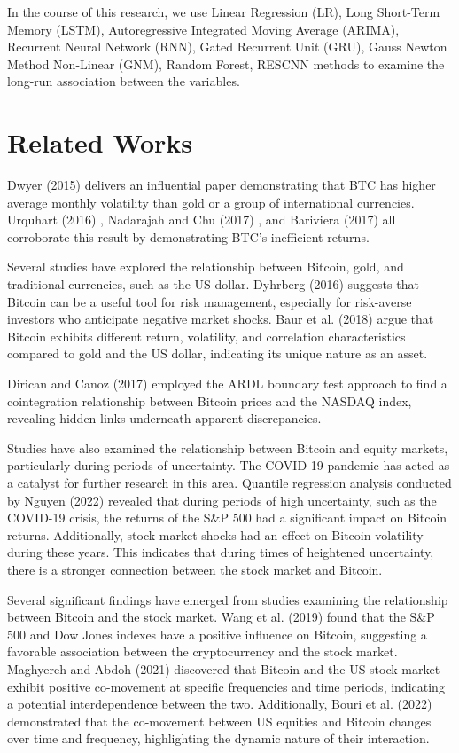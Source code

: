 \documentclass{ieeeojies}
\begin{document}
In the course of this research, we use  Linear Regression (LR), Long Short-Term Memory (LSTM), Autoregressive Integrated Moving Average (ARIMA), Recurrent Neural Network (RNN), Gated Recurrent Unit (GRU), Gauss Newton Method Non-Linear (GNM), Random Forest, RESCNN methods to examine the long-run association between the variables.

\section{Related Works}
Dwyer (2015) \cite{b1} delivers an influential paper demonstrating that BTC has higher average monthly volatility than gold or a group of international currencies. Urquhart (2016) \cite{b2}, Nadarajah and Chu (2017) \cite{b3}, and Bariviera (2017) \cite{b4} all corroborate this result by demonstrating BTC’s inefficient returns. 

Several studies have explored the relationship between Bitcoin, gold, and traditional currencies, such as the US dollar. Dyhrberg (2016) \cite{b5} suggests that Bitcoin can be a useful tool for risk management, especially for risk-averse investors who anticipate negative market shocks. Baur et al. (2018) \cite{b6} argue that Bitcoin exhibits different return, volatility, and correlation characteristics compared to gold and the US dollar, indicating its unique nature as an asset.

Dirican and Canoz (2017) \cite{b7} employed the ARDL boundary test approach to find a cointegration relationship between Bitcoin prices and the NASDAQ index, revealing hidden links underneath apparent discrepancies.

Studies have also examined the relationship between Bitcoin and equity markets, particularly during periods of uncertainty. The COVID-19 pandemic has acted as a catalyst for further research in this area. Quantile regression analysis conducted by Nguyen (2022) \cite{b8} revealed that during periods of high uncertainty, such as the COVID-19 crisis, the returns of the S\&P 500 had a significant impact on Bitcoin returns. Additionally, stock market shocks had an effect on Bitcoin volatility during these years. This indicates that during times of heightened uncertainty, there is a stronger connection between the stock market and Bitcoin.

Several significant findings have emerged from studies examining the relationship between Bitcoin and the stock market. Wang et al. (2019) \cite{b9} found that the S\&P 500 and Dow Jones indexes have a positive influence on Bitcoin, suggesting a favorable association between the cryptocurrency and the stock market. Maghyereh and Abdoh (2021) \cite{b10} discovered that Bitcoin and the US stock market exhibit positive co-movement at specific frequencies and time periods, indicating a potential interdependence between the two. Additionally, Bouri et al. (2022) \cite{b11} demonstrated that the co-movement between US equities and Bitcoin changes over time and frequency, highlighting the dynamic nature of their interaction.
\end{document}
